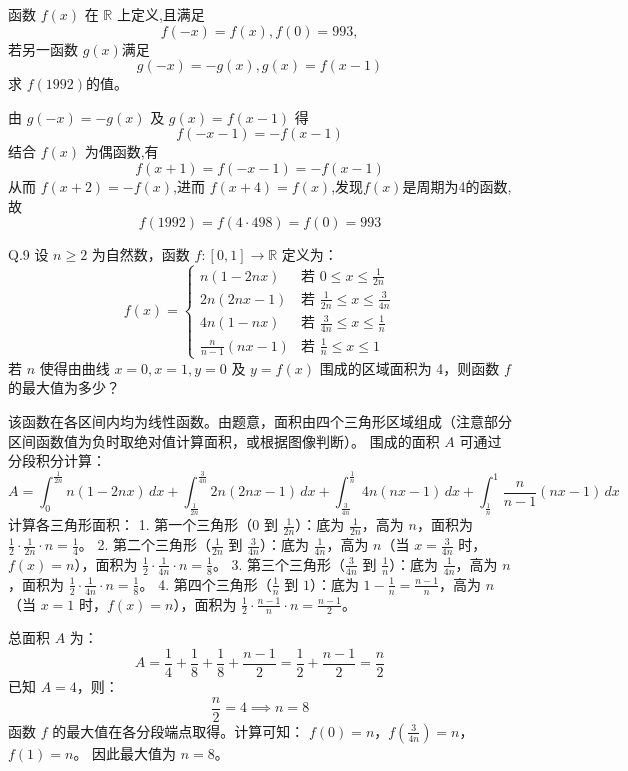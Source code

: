 \begin{questions}
    \question 函数 $f(x)$ 在 $\mathbb{R}$ 上定义,且满足
    \[
    f(-x)=f(x), f(0)=993,
    \]
    若另一函数 $g(x)$满足
    \[
    g(-x)=-g(x),g(x)=f(x-1)
    \]
    求 $f(1992)$的值。
    \begin{solution}
        由 $g(-x)=-g(x)$ 及 $g(x)=f(x-1)$ 得 
        \[
        f(-x-1) = -f(x-1)
        \]
        结合 $f(x)$ 为偶函数,有
        \[
        f(x+1) = f(-x-1) = -f(x-1)
        \]
        从而 $f(x+2) = -f(x)$,进而 $f(x+4) = f(x)$,发现$f(x)$是周期为4的函数,故
        \[
        f(1992) = f(4 \cdot 498) = f(0) = 993
        \]
    \end{solution}

    \question
Q.9 设 $n \geq 2$ 为自然数，函数 $f: [0, 1] \to \mathbb{R}$ 定义为：
\[
f(x) = \begin{cases} n(1-2nx) & \text{若 } 0 \leq x \leq \frac{1}{2n} \\ 2n(2nx-1) & \text{若 } \frac{1}{2n} \leq x \leq \frac{3}{4n} \\ 4n(1-nx) & \text{若 } \frac{3}{4n} \leq x \leq \frac{1}{n} \\ \frac{n}{n-1}(nx-1) & \text{若 } \frac{1}{n} \leq x \leq 1 \end{cases}
\]
若 $n$ 使得由曲线 $x=0, x=1, y=0$ 及 $y=f(x)$ 围成的区域面积为 4，则函数 $f$ 的最大值为多少？

\begin{solution}
该函数在各区间内均为线性函数。由题意，面积由四个三角形区域组成（注意部分区间函数值为负时取绝对值计算面积，或根据图像判断）。
围成的面积 $A$ 可通过分段积分计算：
\[
A = \int_{0}^{\frac{1}{2n}} n(1-2nx) \,dx + \int_{\frac{1}{2n}}^{\frac{3}{4n}} 2n(2nx-1) \,dx + \int_{\frac{3}{4n}}^{\frac{1}{n}} 4n(nx-1) \,dx + \int_{\frac{1}{n}}^{1} \frac{n}{n-1}(nx-1) \,dx
\]
计算各三角形面积：
1. 第一个三角形（$0$ 到 $\frac{1}{2n}$）：底为 $\frac{1}{2n}$，高为 $n$，面积为 $\frac{1}{2} \cdot \frac{1}{2n} \cdot n = \frac{1}{4}$。
2. 第二个三角形（$\frac{1}{2n}$ 到 $\frac{3}{4n}$）：底为 $\frac{1}{4n}$，高为 $n$（当 $x=\frac{3}{4n}$ 时，$f(x)=n$），面积为 $\frac{1}{2} \cdot \frac{1}{4n} \cdot n = \frac{1}{8}$。
3. 第三个三角形（$\frac{3}{4n}$ 到 $\frac{1}{n}$）：底为 $\frac{1}{4n}$，高为 $n$，面积为 $\frac{1}{2} \cdot \frac{1}{4n} \cdot n = \frac{1}{8}$。
4. 第四个三角形（$\frac{1}{n}$ 到 $1$）：底为 $1 - \frac{1}{n} = \frac{n-1}{n}$，高为 $n$（当 $x=1$ 时，$f(x)=n$），面积为 $\frac{1}{2} \cdot \frac{n-1}{n} \cdot n = \frac{n-1}{2}$。

总面积 $A$ 为：
\[
A = \frac{1}{4} + \frac{1}{8} + \frac{1}{8} + \frac{n-1}{2} = \frac{1}{2} + \frac{n-1}{2} = \frac{n}{2}
\]
已知 $A = 4$，则：
\[
\frac{n}{2} = 4 \implies n = 8
\]
函数 $f$ 的最大值在各分段端点取得。计算可知：
$f(0) = n$，$f(\frac{3}{4n}) = n$，$f(1) = n$。
因此最大值为 $n = 8$。
\end{solution}


\end{questions}
